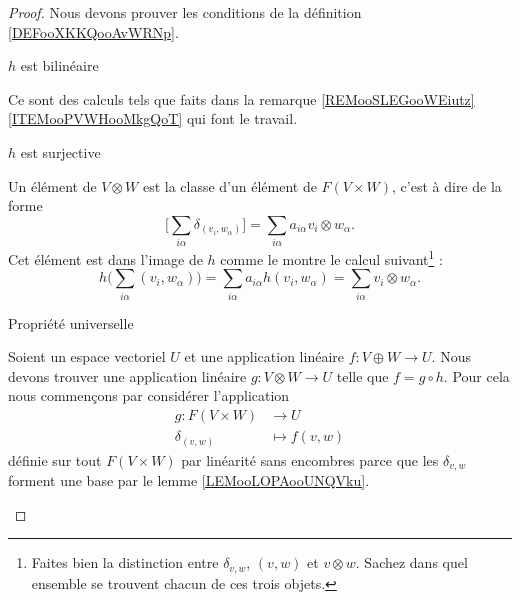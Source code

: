\begin{proof}
    Nous devons prouver les conditions de la définition \ref{DEFooXKKQooAvWRNp}. 
    
    \begin{subproof}
        \item[\( h\) est bilinéaire]

            Ce sont des calculs tels que faits dans la remarque \ref{REMooSLEGooWEiutz}\ref{ITEMooPVWHooMkgQoT} qui font le travail.

        \item[\(h \) est surjective]
    
            Un élément de \( V\otimes W\) est la classe d'un élément de \( F(V\times W)\), c'est à dire de la forme
            \begin{equation}
                \big[ \sum_{i\alpha}\delta_{(v_i,w_{\alpha})} \big]=\sum_{i\alpha}a_{i\alpha}v_i\otimes w_{\alpha}.
            \end{equation}
            Cet élément est dans l'image de \( h\) comme le montre le calcul suivant\footnote{Faites bien la distinction entre \( \delta_{v,w}\), \( (v,w)\) et \( v\otimes w\). Sachez dans quel ensemble se trouvent chacun de ces trois objets.} :
            \begin{equation}
                h\big( \sum_{i\alpha}(v_i,w_{\alpha}) \big)=\sum_{i\alpha}a_{i\alpha}h(v_i,w_{\alpha})=\sum_{i\alpha}v_i\otimes w_{\alpha}.
            \end{equation}

        \item[Propriété universelle]

            Soient un espace vectoriel \( U\) et une application linéaire \( f\colon V\oplus W\to U \). Nous devons trouver une application linéaire \( g\colon V\otimes W\to U\) telle que \( f=g\circ h\). Pour cela nous commençons par considérer l'application
            \begin{equation}
                \begin{aligned}
                    g\colon F(V\times W)&\to U \\
                    \delta_{(v,w)}&\mapsto f(v,w) 
                \end{aligned}
            \end{equation}
            définie sur tout \( F(V\times W)\) par linéarité sans encombres parce que les \( \delta_{v,w}\) forment une base par le lemme \ref{LEMooLOPAooUNQVku}.


\end{subproof}
\end{proof}
